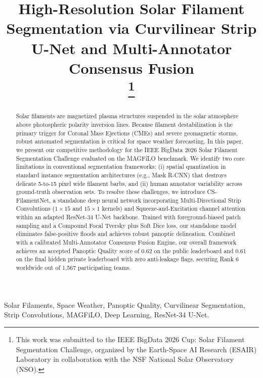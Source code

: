 \documentclass[conference]{IEEEtran}
\begin{document}
\title{High-Resolution Solar Filament Segmentation via Curvilinear Strip U-Net and Multi-Annotator Consensus Fusion\\
\thanks{This work was submitted to the IEEE BigData 2026 Cup: Solar Filament Segmentation Challenge, organized by the Earth-Space AI Research (ESAIR) Laboratory in collaboration with the NSF National Solar Observatory (NSO).}
}

\author{
}

\maketitle

\begin{abstract}
Solar filaments are magnetized plasma structures suspended in the solar atmosphere above photospheric polarity inversion lines. Because filament destabilization is the primary trigger for Coronal Mass Ejections (CMEs) and severe geomagnetic storms, robust automated segmentation is critical for space weather forecasting. In this paper, we present our competitive methodology for the IEEE BigData 2026 Solar Filament Segmentation Challenge evaluated on the MAGFiLO benchmark. We identify two core limitations in conventional segmentation frameworks: (i) spatial quantization in standard instance segmentation architectures (e.g., Mask R-CNN) that destroys delicate 5-to-15 pixel wide filament barbs, and (ii) human annotator variability across ground-truth observation sets. To resolve these challenges, we introduce CS-FilamentNet, a standalone deep neural network incorporating Multi-Directional Strip Convolutions ($1 \times 15$ and $15 \times 1$ kernels) and Squeeze-and-Excitation channel attention within an adapted ResNet-34 U-Net backbone. Trained with foreground-biased patch sampling and a Compound Focal Tversky plus Soft Dice loss, our standalone model eliminates false-positive floods and achieves robust panoptic delineation. Combined with a calibrated Multi-Annotator Consensus Fusion Engine, our overall framework achieves an accepted Panoptic Quality score of 0.62 on the public leaderboard and 0.61 on the final hidden private leaderboard with zero anti-leakage flags, securing Rank 6 worldwide out of 1,567 participating teams.
\end{abstract}

\begin{IEEEkeywords}
Solar Filaments, Space Weather, Panoptic Quality, Curvilinear Segmentation, Strip Convolutions, MAGFiLO, Deep Learning, ResNet-34 U-Net.
\end{IEEEkeywords}
\end{document}
